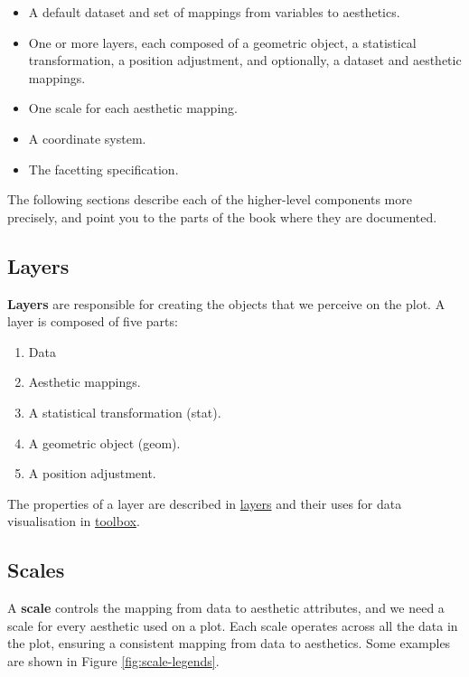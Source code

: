 \begin{itemize}
\item
  A default dataset and set of mappings from variables to aesthetics.
\item
  One or more layers, each composed of a geometric object, a statistical
  transformation, a position adjustment, and optionally, a dataset and
  aesthetic mappings.
\item
  One scale for each aesthetic mapping.
\item
  A coordinate system.
\item
  The facetting specification.
\end{itemize}

The following sections describe each of the higher-level components more
precisely, and point you to the parts of the book where they are
documented.

\subsection{Layers}\label{layers}

\textbf{Layers} are responsible for creating the objects that we
perceive on the plot. A layer is composed of five parts:

\begin{enumerate}
\def\labelenumi{\arabic{enumi}.}
\tightlist
\item
  Data
\item
  Aesthetic mappings.
\item
  A statistical transformation (stat).
\item
  A geometric object (geom).
\item
  A position adjustment.
\end{enumerate}

The properties of a layer are described in
\protect\hyperlink{cha:layers}{layers} and their uses for data
visualisation in \protect\hyperlink{cha:toolbox}{toolbox}.

\subsection{Scales}\label{sub:scales}

A \textbf{scale} controls the mapping from data to aesthetic attributes,
and we need a scale for every aesthetic used on a plot. Each scale
operates across all the data in the plot, ensuring a consistent mapping
from data to aesthetics. Some examples are shown in Figure
\ref{fig:scale-legends}.

